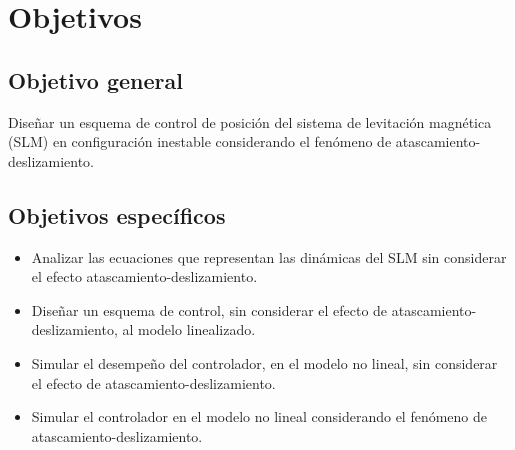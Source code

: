 \chapter{Objetivos}\label{chap:objetivos}

\section{Objetivo general}
Diseñar un esquema de control de posición del sistema de levitación magnética (SLM) en configuración inestable considerando el fenómeno de atascamiento-deslizamiento.

\section{Objetivos específicos}
\begin{itemize}
	\item Analizar las ecuaciones que representan las dinámicas del SLM sin considerar el efecto atascamiento-deslizamiento. 
	\item Diseñar un esquema de control, sin considerar el efecto de atascamiento-deslizamiento, al modelo linealizado.
	\item Simular el desempeño del controlador, en el modelo no lineal, sin considerar el efecto de atascamiento-deslizamiento.
	\item Simular el controlador en el modelo no lineal considerando el fenómeno de atascamiento-deslizamiento.
\end{itemize}